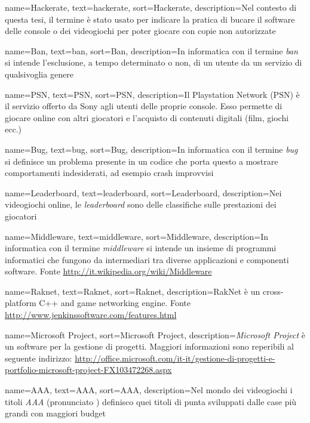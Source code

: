 {
	name=Hackerate,
	text=hackerate,
	sort=Hackerate,
	description={Nel contesto di questa tesi, il termine è stato usato per indicare la pratica di bucare il software delle console o dei videogiochi per poter giocare con copie non autorizzate}
}

{
	name=Ban,
	text=ban,
	sort=Ban,
	description={In informatica con il termine \emph{ban} si intende l'esclusione, a tempo determinato o non, di un utente da un servizio di qualsivoglia genere}
}

{
	name=PSN\textsuperscript{\textregistered},
	text=PSN\textsuperscript{\textregistered},
	sort=PSN,
	description={Il Playstation Network\textsuperscript{\textregistered} (PSN\textsuperscript{\textregistered}) è il servizio offerto da Sony agli utenti delle proprie console. Esso permette di giocare online con altri giocatori e l'acquisto di contenuti digitali (film, giochi ecc.)}
}

{
	name=Bug,
	text=bug,
	sort=Bug,
	description={In informatica con il termine \emph{bug} si definisce un problema presente in un codice che porta questo a mostrare comportamenti indesiderati, ad esempio crash improvvisi}
}

{
	name=Leaderboard,
	text=leaderboard,
	sort=Leaderboard,
	description={Nei videogiochi online, le \emph{leaderboard} sono delle classifiche sulle prestazioni dei giocatori}
}

{
	name=Middleware,
	text=middleware,
	sort=Middleware,
	description={In informatica con il termine \emph{middleware} si intende un insieme di programmi informatici che fungono da intermediari tra diverse applicazioni e componenti software. Fonte \url{http://it.wikipedia.org/wiki/Middleware}}
}

{
	name=Raknet,
	text=Raknet,
	sort=Raknet,
	description={RakNet è un cross-platform C++ and \Csharp\space game networking engine. Fonte \url{http://www.jenkinssoftware.com/features.html}}
}

{
	name=Microsoft Project,
	sort=Microsoft Project,
	description={\emph{Microsoft Project} è un software per la gestione di progetti. Maggiori informazioni sono reperibili al seguente indirizzo: \url{http://office.microsoft.com/it-it/gestione-di-progetti-e-portfolio-microsoft-project-FX103472268.aspx}}
}

{
	name=AAA,
	text=AAA,
	sort=AAA,
	description={Nel mondo dei videogiochi i titoli \emph{AAA} (pronunciato ) definisco quei titoli di punta sviluppati dalle case più grandi con maggiori budget}
}

